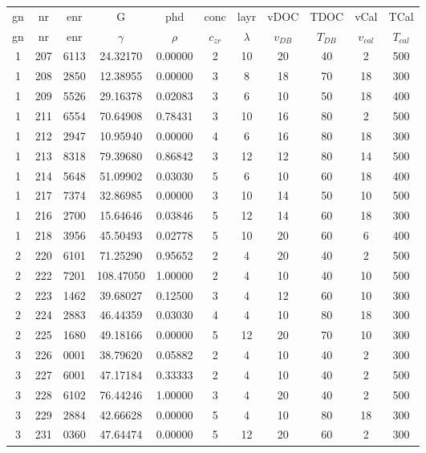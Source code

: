 \begin{table}[h]
	\centering
	\label{tab:emma_all}
	\begin{tabular}{ccccccccccc}
        \hline\hline
        gn  &nr	    &enr	&G	&phd	&conc	    &layr	&vDOC	&TDOC	&vCal	&TCal\\
		gn  &nr	    &enr	&$\gamma$	&$\rho$	&$c_{zr}$	    &$\lambda$	&$v_{DB}$	&$T_{DB}$	&$v_{cal}$	&$T_{cal}$\\
        \hline
        1   &207	&6113	&24.32170	&0.00000	&2	&10	&20	&40	&2	&500\\
        1   &208	&2850	&12.38955	&0.00000	&3	&8	&18	&70	&18	&300\\
        1   &209	&5526	&29.16378	&0.02083	&3	&6	&10	&50	&18	&400\\
        1   &211	&6554	&70.64908	&0.78431	&3	&10	&16	&80	&2	&500\\
        1   &212	&2947	&10.95940	&0.00000	&4	&6	&16	&80	&18	&300\\
        1   &213	&8318	&79.39680	&0.86842	&3	&12	&12	&80	&14	&500\\
        1   &214	&5648	&51.09902	&0.03030	&5	&6	&10	&60	&18	&400\\
        1   &217	&7374	&32.86985	&0.00000	&3	&10	&14	&50	&10	&500\\
        1   &216	&2700	&15.64646	&0.03846	&5	&12	&14	&60	&18	&300\\
        1   &218	&3956	&45.50493	&0.02778	&5	&10	&20	&60	&6	&400\\

        2   &220	&6101	&71.25290	&0.95652	&2	&4	&20	&40	&2	&500\\
        2   &222	&7201	&108.47050	&1.00000	&2	&4	&10	&40	&10	&500\\
        2   &223	&1462	&39.68027	&0.12500	&3	&4	&12	&60	&10	&300\\
        2   &224	&2883	&46.44359	&0.03030	&4	&4	&10	&80	&18	&300\\
        2   &225	&1680	&49.18166	&0.00000	&5	&12	&20	&70	&10	&300\\

        3   &226	&0001	&38.79620	&0.05882	&2	&4	&10	&40	&2	&300\\
        3   &227	&6001	&47.17184	&0.33333	&2	&4	&10	&40	&2	&500\\
        3   &228	&6102	&76.44246	&1.00000	&3	&4	&20	&40	&2	&500\\
        3   &229	&2884	&42.66628	&0.00000	&5	&4	&10	&80	&18	&300\\
        3   &231	&0360	&47.64474	&0.00000	&5	&12	&20	&60	&2	&300\\


\end{tabular}
\end{table}
